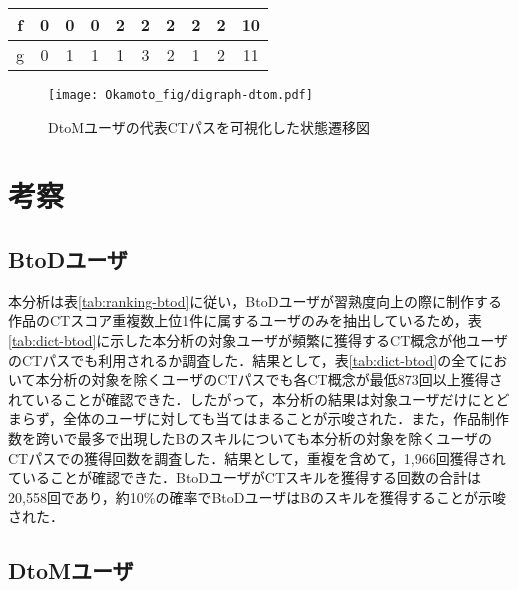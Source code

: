 \documentclass[11pt,dvipdfmx]{jreport}
\begin{document}
\begin{table}[h]
\begin{minipage}[t]{0.55\linewidth}
\begin{tabular}{c|c|cccccccc}
f                   & 0                                           & \multicolumn{1}{c|}{0} & \multicolumn{1}{c|}{0} & \multicolumn{1}{c|}{2} & \multicolumn{1}{c|}{2} & \multicolumn{1}{c|}{2} & \multicolumn{1}{c|}{2} & \multicolumn{1}{c|}{2} & 10  \\ \hline
g                   & 0                                           & \multicolumn{1}{c|}{1} & \multicolumn{1}{c|}{1} & \multicolumn{1}{c|}{1} & \multicolumn{1}{c|}{3} & \multicolumn{1}{c|}{2} & \multicolumn{1}{c|}{1} & \multicolumn{1}{c|}{2} & 11 \\ \hline
\end{tabular}
  \end{minipage}
\end{table}

\begin{figure*}[t]
	\centering
	\texttt{[image: Okamoto\_fig/digraph-dtom.pdf]}
        \vspace{-5mm}
	\caption{DtoMユーザの代表CTパスを可視化した状態遷移図}
	\label{fig:digraph-dtom}
\end{figure*}

\section{考察}

\subsection*{BtoDユーザ}

本分析は表\ref{tab:ranking-btod}に従い，BtoDユーザが習熟度向上の際に制作する作品のCTスコア重複数上位1件に属するユーザのみを抽出しているため，表\ref{tab:dict-btod}に示した本分析の対象ユーザが頻繁に獲得するCT概念が他ユーザのCTパスでも利用されるか調査した．結果として，表\ref{tab:dict-btod}の全てにおいて本分析の対象を除くユーザのCTパスでも各CT概念が最低873回以上獲得されていることが確認できた．したがって，本分析の結果は対象ユーザだけにとどまらず，全体のユーザに対しても当てはまることが示唆された．また，作品制作数を跨いで最多で出現したBのスキルについても本分析の対象を除くユーザのCTパスでの獲得回数を調査した．結果として，重複を含めて，1,966回獲得されていることが確認できた．BtoDユーザがCTスキルを獲得する回数の合計は20,558回であり，約10\%の確率でBtoDユーザはBのスキルを獲得することが示唆された．

\subsection*{DtoMユーザ}
\end{document}
